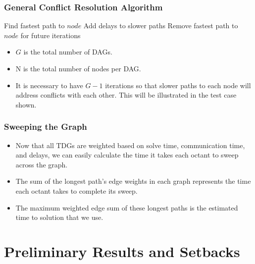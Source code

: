 \documentclass[xcolor={usenames,dvipsnames,svgnames,table}]{beamer}
\begin{document}
\begin{frame}[t]\frametitle{General Conflict Resolution Algorithm}
\begin{algorithm}[H]
\begin{algorithmic}[1]
\STATE Find fastest path to $node$
\STATE Add delays to slower paths
\STATE Remove fastest path to $node$ for future iterations
\ENDFOR
\ENDFOR	
\label{conflict}
\end{algorithmic}
\end{algorithm}

\begin{block}{}
\begin{itemize}
	\item $G$ is the total number of DAGs.
	\item N is the total number of nodes per DAG.
	\item It is necessary to have $G-1$ iterations so that slower paths to each node will address conflicts with each other. This will be illustrated in the test case shown.
\end{itemize}
\end{block}
\end{frame}

\begin{frame}[t]\frametitle{Sweeping the Graph}
\begin{block}{}
\begin{itemize}
	\item Now that all TDGs are weighted based on solve time, communication time, and delays, we can easily calculate the time it takes each octant to sweep across the graph. 
	\item The sum of the  longest path's edge weights in each graph represents the time each octant takes to complete its sweep.
	\item The maximum weighted edge sum of these longest paths is the estimated time to solution that we use.
\end{itemize}
\end{block}
\end{frame}

\section{Preliminary Results and Setbacks}
\end{document}
